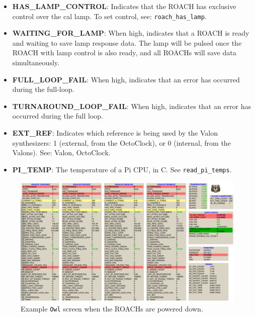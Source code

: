 \begin{itemize}[leftmargin=*,label={}]
\item \textbf{HAS\_LAMP\_CONTROL}: Indicates that the ROACH has exclusive control over the cal lamp. To set control, see: \texttt{roach\_has\_lamp}.

\item \textbf{WAITING\_FOR\_LAMP}: When high, indicates that a ROACH is ready and waiting to save lamp response data. The lamp will be pulsed once the ROACH with lamp control is also ready, and all ROACHs will save data simultaneously.

\item \textbf{FULL\_LOOP\_FAIL}: When high, indicates that an error has occurred during the full-loop.

\item \textbf{TURNAROUND\_LOOP\_FAIL}: When high, indicates that an error has occurred during the full loop.

\item \textbf{EXT\_REF}: Indicates which reference is being used by the Valon synthesizers: 1 (external, from the OctoClock), or 0 (internal, from the Valons). See: Valon, OctoClock.

\item \textbf{PI\_TEMP}: The temperature of a Pi CPU, in C. See \texttt{read\_pi\_temps}.

\end{itemize}

\begin{figure}
\includegraphics[width=\linewidth,keepaspectratio]{./figures/software/roaches_off}
\caption[Example OWL screen when the ROACHs are powered down.]{Example \texttt{Owl} screen when the ROACHs are powered down.}
\label{fig:roaches off screen}
\end{figure}

